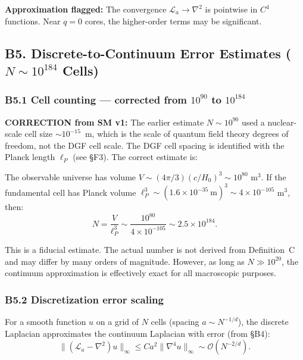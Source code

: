 \documentclass[reprint]{revtex4-2}
\begin{document}
\textbf{Approximation flagged:} The convergence $\mathcal{L}_a \to \nabla^2$ is pointwise in $C^4$ functions. Near $q=0$ cores, the higher-order terms may be significant.

\subsection{B5. Discrete-to-Continuum Error Estimates ($N\sim 10^{184}$ Cells)}

\subsubsection{B5.1 Cell counting --- corrected from $10^{90}$ to $10^{184}$}

\textbf{CORRECTION from SM v1:} The earlier estimate $N\sim 10^{90}$ used a nuclear-scale cell size $\sim 10^{-15}$~m, which is the scale of quantum field theory degrees of freedom, not the DGF cell scale. The DGF cell spacing is identified with the Planck length $\ell_P$ (see \S F3). The correct estimate is:

The observable universe has volume $V \sim (4\pi/3)(c/H_0)^3 \sim 10^{80}$ m$^3$. If the fundamental cell has Planck volume $\ell_P^3 \sim (1.6\times 10^{-35}~\text{m})^3 \sim 4\times 10^{-105}$ m$^3$, then:
\begin{equation}
\boxed{N = \frac{V}{\ell_P^3} \sim \frac{10^{80}}{4\times 10^{-105}} \sim 2.5\times 10^{184}}.
\label{eq:N_estimate}
\end{equation}

This is a fiducial estimate. The actual number is not derived from Definition~C and may differ by many orders of magnitude. However, as long as $N \gg 10^{20}$, the continuum approximation is effectively exact for all macroscopic purposes.

\subsubsection{B5.2 Discretization error scaling}

For a smooth function $u$ on a grid of $N$ cells (spacing $a \sim N^{-1/d}$), the discrete Laplacian approximates the continuum Laplacian with error (from \S B4):
\begin{equation}
\|(\mathcal{L}_a - \nabla^2)u\|_\infty \le C a^2 \|\nabla^4 u\|_\infty \sim \mathcal{O}(N^{-2/d}).
\end{equation}
\end{document}
